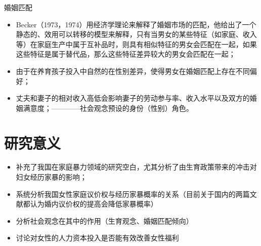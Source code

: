 \documentclass{beamer}
\begin{document}
\begin{frame}{婚姻匹配}
    \begin{itemize}[<+-| alert@+>] 
        \item Becker（1973，1974）用经济学理论来解释了婚姻市场的匹配，他给出了一个静态的、效用可以转移的模型来解释，只有当男女的某些特征（如家庭、收入等）在家庭生产中属于互补品时，则具有相似特征的男女会匹配在一起，如果这些特征是属于替代品，那么这些特征差异较大的男女会匹配在一起；
        \item 由于在养育孩子投入中自然的在性别差异，使得男女在婚姻匹配上存在不同偏好；
        \item 丈夫和妻子的相对收入高低会影响妻子的劳动参与率、收入水平以及双方的婚姻满意度；————社会观念预设的身份（性别）角色。
    \end{itemize}
\end{frame}

\section{研究意义}
\begin{frame}
    \begin{itemize}[<+-| alert@+>] 
        \item 补充了我国在家庭暴力领域的研究空白，尤其分析了由生育政策带来的冲击对妇女经历家暴的影响；
        \item 系统分析我国女性家庭议价权与经历家暴概率的关系（目前关于国内的两篇文献都认为婚内议价权的提高会降低家暴概率）
        \item 分析社会观念在其中的作用（生育观念、婚姻匹配倾向）
        \item 讨论对女性的人力资本投入是否能有效改善女性福利
    \end{itemize}
\end{frame}
\end{document}
